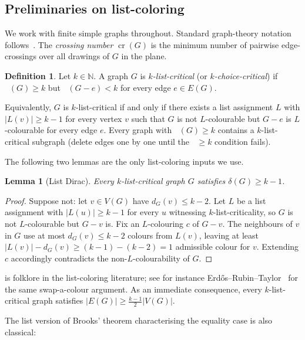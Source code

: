 \documentclass[11pt,a4paper]{article}
\newtheorem{lemma}[theorem]{Lemma}
\theoremstyle{definition}
\newtheorem{definition}[theorem]{Definition}
\DeclareMathOperator{\crN}{cr}
\DeclareMathOperator{\chl}{\chi_{\ell}}
\newcommand{\NN}{\mathbb{N}}
\begin{document}
\subsection{Preliminaries on list-coloring}\label{ssec:prelim-list}

We work with finite simple graphs throughout. Standard graph-theory
notation follows~\cite{Diestel}. The \emph{crossing number}
$\crN(G)$ is the minimum number of pairwise edge-crossings over all
drawings of $G$ in the plane.

\begin{definition}\label{def:list-critical}
Let $k \in \NN$. A graph $G$ is \emph{$k$-list-critical} (or
\emph{$k$-choice-critical}) if $\chl(G) \ge k$ but
$\chl(G - e) < k$ for every edge $e \in E(G)$.
\end{definition}

Equivalently, $G$ is $k$-list-critical if and only if there exists
a list assignment $L$ with $|L(v)| \ge k - 1$ for every vertex $v$
such that $G$ is not $L$-colourable but $G - e$ is $L$-colourable
for every edge $e$. Every graph with $\chl(G) \ge k$ contains a
$k$-list-critical subgraph (delete edges one by one until the
$\chl \ge k$ condition fails).

The following two lemmas are the only list-coloring inputs we use.

\begin{lemma}[List Dirac]\label{lem:list-dirac}
Every $k$-list-critical graph $G$ satisfies $\delta(G) \ge k - 1$.
\end{lemma}

\begin{proof}
Suppose not: let $v \in V(G)$ have $d_G(v) \le k - 2$. Let $L$ be a
list assignment with $|L(u)| \ge k - 1$ for every $u$ witnessing
$k$-list-criticality, so $G$ is not $L$-colourable but $G - v$ is.
Fix an $L$-colouring $c$ of $G - v$. The neighbours of $v$ in $G$
use at most $d_G(v) \le k - 2$ colours from $L(v)$, leaving at least
$|L(v)| - d_G(v) \ge (k - 1) - (k - 2) = 1$ admissible colour for
$v$. Extending $c$ accordingly contradicts the non-$L$-colourability
of $G$.
\end{proof}

 is folklore in the list-coloring literature;
see for instance Erd\H{o}s--Rubin--Taylor~\cite[Theorem 2]{ERT} for
the same swap-a-colour argument. As an immediate consequence, every
$k$-list-critical graph satisfies
$|E(G)| \ge \tfrac{k-1}{2}|V(G)|$.

The list version of Brooks' theorem characterising the equality
case is also classical:
\end{document}
